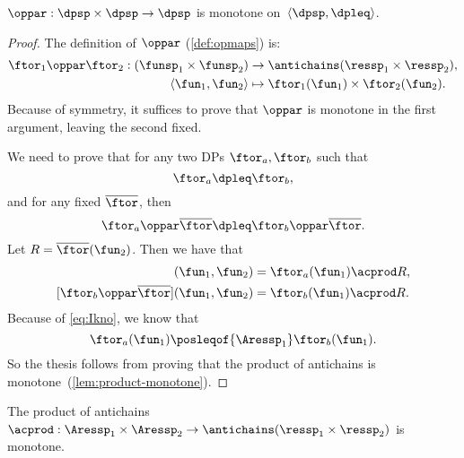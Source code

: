 \begin{lemma}
	\label{lem:par-monotone}$\oppar:\dpsp\times\dpsp\rightarrow\dpsp$
	is monotone on~$\langle\dpsp,\dpleq\rangle$.
\end{lemma}
\begin{proof}
	The definition of $\oppar$ (\cref{def:opmaps}) is:
	\begin{align*}
		\ftor_{1}\oppar\ftor_{2}:(\funsp_{1}\times\funsp_{2}) & \rightarrow\antichains(\ressp_{1}\times\ressp_{2}),  \\
		\left\langle \fun_{1},\fun_{2}\right\rangle           & \mapsto\ftor_{1}(\fun_{1})\times\ftor_{2}(\fun_{2}).
	\end{align*}
	Because of symmetry, it suffices to prove that $\oppar$ is monotone
	in the first argument, leaving the second fixed.

	We need to prove that for any two DPs $\ftor_{a},\ftor_{b}$ such
	that
	\begin{equation}
		\ftor_{a}\dpleq\ftor_{b},\label{eq:Ikno}
	\end{equation}
	and for any fixed $\overline{\ftor}$, then
	\[
		\ftor_{a}\oppar\overline{\ftor}\dpleq\ftor_{b}\oppar\overline{\ftor}.
	\]
	Let $R=\overline{\ftor}(\fun_{2})$.
	Then we have that
	\begin{align*}
		[\ftor_{a}\oppar\overline{\ftor}]
		(\fun_{1},\fun_{2})
		                                                     & =\ftor_{a}(\fun_{1})\acprod R,\\{}
		[\ftor_{b}\oppar\overline{\ftor}](\fun_{1},\fun_{2}) & =\ftor_{b}(\fun_{1})\acprod R.
	\end{align*}
	Because of \cref{eq:Ikno}, we know that
	\[
		\ftor_{a}(\fun_{1})\posleqof{\Aressp_{1}}\ftor_{b}(\fun_{1}).
	\]
	So the thesis follows from proving that the product of antichains
	is monotone~(\cref{lem:product-monotone}).
\end{proof}
\begin{lemma}
	\label{lem:product-monotone}
	The product of antichains~$\acprod:\Aressp_{1}\times\Aressp_{2}\rightarrow\antichains(\ressp_{1}\times\ressp_{2})$
	is monotone.
\end{lemma}

